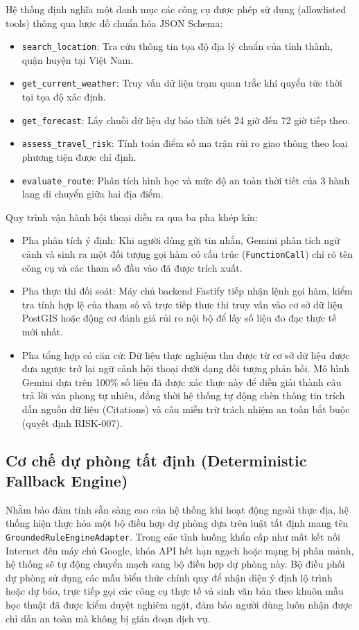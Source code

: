 Hệ thống định nghĩa một danh mục các công cụ được phép sử dụng (allowlisted tools) thông qua lược đồ chuẩn hóa JSON Schema:
\begin{itemize}
    \item[-] \texttt{search\_location}: Tra cứu thông tin tọa độ địa lý chuẩn của tỉnh thành, quận huyện tại Việt Nam.
    \item[-] \texttt{get\_current\_weather}: Truy vấn dữ liệu trạm quan trắc khí quyển tức thời tại tọa độ xác định.
    \item[-] \texttt{get\_forecast}: Lấy chuỗi dữ liệu dự báo thời tiết 24 giờ đến 72 giờ tiếp theo.
    \item[-] \texttt{assess\_travel\_risk}: Tính toán điểm số ma trận rủi ro giao thông theo loại phương tiện được chỉ định.
    \item[-] \texttt{evaluate\_route}: Phân tích hình học và mức độ an toàn thời tiết của 3 hành lang di chuyển giữa hai địa điểm.
\end{itemize}

Quy trình vận hành hội thoại diễn ra qua ba pha khép kín:
\begin{itemize}
    \item[-] Pha phân tích ý định: Khi người dùng gửi tin nhắn, Gemini phân tích ngữ cảnh và sinh ra một đối tượng gọi hàm có cấu trúc (\texttt{FunctionCall}) chỉ rõ tên công cụ và các tham số đầu vào đã được trích xuất.
    \item[-] Pha thực thi đối soát: Máy chủ backend Fastify tiếp nhận lệnh gọi hàm, kiểm tra tính hợp lệ của tham số và trực tiếp thực thi truy vấn vào cơ sở dữ liệu PostGIS hoặc động cơ đánh giá rủi ro nội bộ để lấy số liệu đo đạc thực tế mới nhất.
    \item[-] Pha tổng hợp có căn cứ: Dữ liệu thực nghiệm thu được từ cơ sở dữ liệu được đưa ngược trở lại ngữ cảnh hội thoại dưới dạng đối tượng phản hồi. Mô hình Gemini dựa trên 100\% số liệu đã được xác thực này để diễn giải thành câu trả lời văn phong tự nhiên, đồng thời hệ thống tự động chèn thông tin trích dẫn nguồn dữ liệu (Citations) và câu miễn trừ trách nhiệm an toàn bắt buộc (quyết định RISK-007).
\end{itemize}

\subsection{Cơ chế dự phòng tất định (Deterministic Fallback Engine)}

Nhằm bảo đảm tính sẵn sàng cao của hệ thống khi hoạt động ngoài thực địa, hệ thống hiện thực hóa một bộ điều hợp dự phòng dựa trên luật tất định mang tên \texttt{GroundedRuleEngineAdapter}. Trong các tình huống khẩn cấp như mất kết nối Internet đến máy chủ Google, khóa API hết hạn ngạch hoặc mạng bị phân mảnh, hệ thống sẽ tự động chuyển mạch sang bộ điều hợp dự phòng này. Bộ điều phối dự phòng sử dụng các mẫu biểu thức chính quy để nhận diện ý định lộ trình hoặc dự báo, trực tiếp gọi các công cụ thực tế và sinh văn bản theo khuôn mẫu học thuật đã được kiểm duyệt nghiêm ngặt, đảm bảo người dùng luôn nhận được chỉ dẫn an toàn mà không bị gián đoạn dịch vụ.

